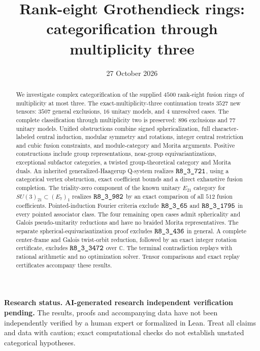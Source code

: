 \documentclass[11pt,reqno]{amsart}
\title{Rank-eight Grothendieck rings:\\
categorification through multiplicity three}
\date{27 October 2026}
\theoremstyle{definition}
\theoremstyle{remark}
\newcommand{\sha}[1]{\texttt{\detokenize{#1}}}
\begin{document}
\begin{abstract}
We investigate complex categorification of the supplied $4500$ rank-eight fusion rings of multiplicity at most three. The exact-multiplicity-three continuation treats $3527$ new tensors: $3507$ general exclusions, $16$ unitary models, and $4$ unresolved cases. The complete classification through multiplicity two is preserved: $896$ exclusions and $77$ unitary models. Unified obstructions combine signed sphericalization, full character-labeled central induction, modular symmetry and rotations, integer central restriction and cubic fusion constraints, and module-category and Morita arguments. Positive constructions include group representations, near-group equivariantizations, exceptional subfactor categories, a twisted group-theoretical category and Morita duals. An inherited generalized-Haagerup Q-system realizes $\sha{R8_3_721}$, using a categorical vertex obstruction, exact coefficient bounds and a direct exhaustive fusion completion. The triality-zero component of the known unitary $E_{21}$ category for $SU(3)_{21}\subset(E_7)_1$ realizes $\sha{R8_3_982}$ by an exact comparison of all $512$ fusion coefficients. Pointed-induction Fourier criteria exclude $\sha{R8_3_65}$ and $\sha{R8_3_1795}$ in every pointed associator class. The four remaining open cases admit sphericality and Galois pseudo-unitarity reductions and have no braided Morita representatives. The separate spherical-equivariantization proof excludes $\sha{R8_3_436}$ in general. A complete center-frame and Galois twist-orbit reduction, followed by an exact integer rotation certificate, excludes $\sha{R8_3_3472}$ over $\mathbb C$. The terminal contradiction replays with rational arithmetic and no optimization solver. Tensor comparisons and exact replay certificates accompany these results.
\end{abstract}
\maketitle
\raggedbottom
\par\smallskip\noindent\textbf{Research status.}
\textbf{AI-generated research \textperiodcentered{} independent verification pending.}
The results, proofs and accompanying data have not been independently verified
by a human expert or formalized in Lean.
Treat all claims and data with caution; exact computational checks do not establish
unstated categorical hypotheses.
\end{document}
